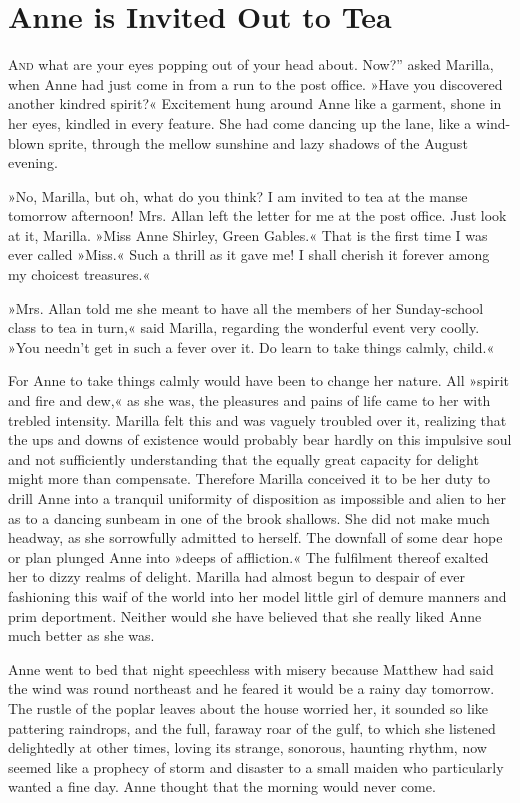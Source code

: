 \chapter{Anne is Invited Out to Tea}

\lettrine[ante=“,lines=4]{A}{nd} what are your eyes popping out of your head about. Now?” asked Marilla, when Anne had just come in from a run to the post office. »Have you discovered another kindred spirit?« Excitement hung around Anne like a garment, shone in her eyes, kindled in every feature. She had come dancing up the lane, like a wind-blown sprite, through the mellow sunshine and lazy shadows of the August evening.

»No, Marilla, but oh, what do you think? I am invited to tea at the manse tomorrow afternoon! Mrs. Allan left the letter for me at the post office. Just look at it, Marilla. »Miss Anne Shirley, Green Gables.« That is the first time I was ever called »Miss.« Such a thrill as it gave me! I shall cherish it forever among my choicest treasures.«

»Mrs. Allan told me she meant to have all the members of her Sunday-school class to tea in turn,« said Marilla, regarding the wonderful event very coolly. »You needn’t get in such a fever over it. Do learn to take things calmly, child.«

For Anne to take things calmly would have been to change her nature. All »spirit and fire and dew,« as she was, the pleasures and pains of life came to her with trebled intensity. Marilla felt this and was vaguely troubled over it, realizing that the ups and downs of existence would probably bear hardly on this impulsive soul and not sufficiently understanding that the equally great capacity for delight might more than compensate. Therefore Marilla conceived it to be her duty to drill Anne into a tranquil uniformity of disposition as impossible and alien to her as to a dancing sunbeam in one of the brook shallows. She did not make much headway, as she sorrowfully admitted to herself. The downfall of some dear hope or plan plunged Anne into »deeps of affliction.« The fulfilment thereof exalted her to dizzy realms of delight. Marilla had almost begun to despair of ever fashioning this waif of the world into her model little girl of demure manners and prim deportment. Neither would she have believed that she really liked Anne much better as she was.

Anne went to bed that night speechless with misery because Matthew had said the wind was round northeast and he feared it would be a rainy day tomorrow. The rustle of the poplar leaves about the house worried her, it sounded so like pattering raindrops, and the full, faraway roar of the gulf, to which she listened delightedly at other times, loving its strange, sonorous, haunting rhythm, now seemed like a prophecy of storm and disaster to a small maiden who particularly wanted a fine day. Anne thought that the morning would never come.

